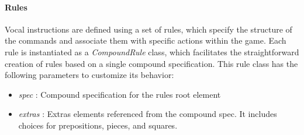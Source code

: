 \documentclass[a4paper, 11pt, twocolumn]{IEEEtran}
\begin{document}
    \paragraph*{Rules} Vocal instructions are defined using a set of rules, which specify the structure of the commands and associate them with specific actions within the game. Each rule is instantiated as a \emph{CompoundRule} class, which facilitates the straightforward creation of rules based on a single compound specification. This rule class has the following parameters to customize its behavior:
    \begin{itemize}
        \item \emph{spec} : Compound specification for the rules root element 
        \item \emph{extras} : Extras elements referenced from the compound spec. It includes choices for prepositions, pieces, and squares.
    \end{itemize}
\end{document}
